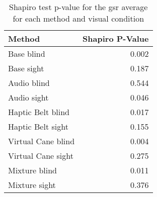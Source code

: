 
\begin{table}[!htb]
\centering
\caption{Shapiro test p-value for the gsr average for each method and visual condition}
\label{tab:shapiro_gsr_avg}
\begin{tabular}{lr}
\toprule
            Method &  Shapiro P-Value \\
\midrule
        Base blind &            0.002 \\
        Base sight &            0.187 \\
       Audio blind &            0.544 \\
       Audio sight &            0.046 \\
 Haptic Belt blind &            0.017 \\
 Haptic Belt sight &            0.155 \\
Virtual Cane blind &            0.004 \\
Virtual Cane sight &            0.275 \\
     Mixture blind &            0.011 \\
     Mixture sight &            0.376 \\
\bottomrule
\end{tabular}
\end{table}

